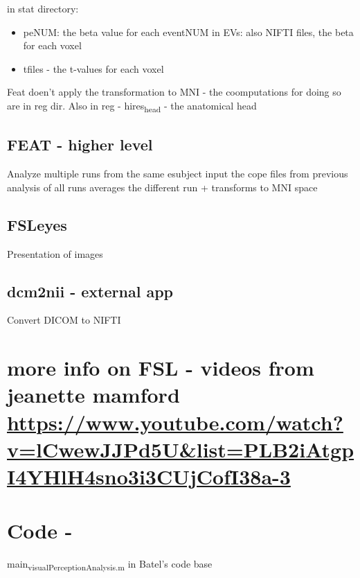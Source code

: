 \documentclass[11pt]{article}
\begin{document}
in stat directory:
\begin{itemize}
\item peNUM: the beta value for each eventNUM in EVs: also NIFTI files, the beta for each voxel
\item tfiles - the t-values for each voxel
\end{itemize}

Feat doen't apply the transformation to MNI - the coomputations for doing so are in reg dir.
Also in reg - hires\textsubscript{head} - the anatomical head

\subsection{FEAT - higher level}
\label{sec:orgf346807}
Analyze multiple runs from the same esubject
input the cope files from previous analysis of all runs
averages the different run + transforms to MNI space

\subsection{FSLeyes}
\label{sec:orga33e4ba}
Presentation of images

\subsection{dcm2nii - external app}
\label{sec:org9cffe3b}
Convert DICOM to NIFTI

\section{more info on FSL - videos from jeanette mamford \url{https://www.youtube.com/watch?v=lCwewJJPd5U\&list=PLB2iAtgpI4YHlH4sno3i3CUjCofI38a-3}}
\label{sec:org40ecc9a}
\section{Code -}
\label{sec:orge30e7c9}
main\textsubscript{visualPerceptionAnalysis.m} in Batel's code base
\end{document}
